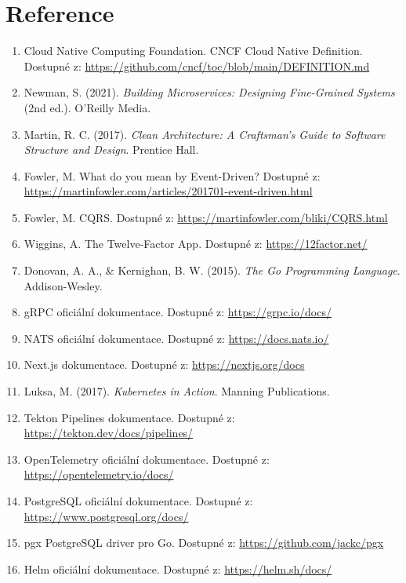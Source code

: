 \documentclass[11pt, a4paper, oneside]{article}
\begin{document}
\clearpage
\section*{Reference}
\begin{enumerate}
    \item \label{cncf} Cloud Native Computing Foundation. CNCF Cloud Native Definition. Dostupné z: \url{https://github.com/cncf/toc/blob/main/DEFINITION.md}
    \item \label{newman} Newman, S. (2021). \textit{Building Microservices: Designing Fine-Grained Systems} (2nd ed.). O'Reilly Media.
    \item \label{martin} Martin, R. C. (2017). \textit{Clean Architecture: A Craftsman's Guide to Software Structure and Design}. Prentice Hall.
    \item \label{fowler-eda} Fowler, M. What do you mean by Event-Driven? Dostupné z: \url{https://martinfowler.com/articles/201701-event-driven.html}
    \item \label{fowler-cqrs} Fowler, M. CQRS. Dostupné z: \url{https://martinfowler.com/bliki/CQRS.html}
    \item \label{twelve-factor} Wiggins, A. The Twelve-Factor App. Dostupné z: \url{https://12factor.net/}
    \item \label{go-book} Donovan, A. A., \& Kernighan, B. W. (2015). \textit{The Go Programming Language}. Addison-Wesley.
    \item \label{grpc-doc} gRPC oficiální dokumentace. Dostupné z: \url{https://grpc.io/docs/}
    \item \label{nats-doc} NATS oficiální dokumentace. Dostupné z: \url{https://docs.nats.io/}
    \item \label{nextjs} Next.js dokumentace. Dostupné z: \url{https://nextjs.org/docs}
    \item \label{luksa} Luksa, M. (2017). \textit{Kubernetes in Action}. Manning Publications.
    \item \label{tekton} Tekton Pipelines dokumentace. Dostupné z: \url{https://tekton.dev/docs/pipelines/}
    \item \label{otel} OpenTelemetry oficiální dokumentace. Dostupné z: \url{https://opentelemetry.io/docs/}
    \item PostgreSQL oficiální dokumentace. Dostupné z: \url{https://www.postgresql.org/docs/}
    \item pgx PostgreSQL driver pro Go. Dostupné z: \url{https://github.com/jackc/pgx}
    \item Helm oficiální dokumentace. Dostupné z: \url{https://helm.sh/docs/}

\end{enumerate}
\end{document}
